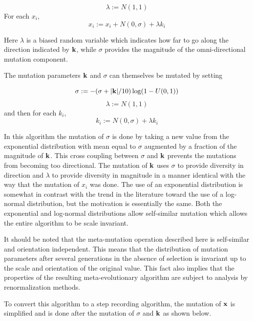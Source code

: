 \documentclass[12pt, titlepage]{article}
\begin{document}
\begin{displaymath}
\lambda := N(1,1)
\end{displaymath}
For each $x_i$,
\begin{displaymath}
x_i := x_i + N(0, \sigma) + \lambda k_i 
\end{displaymath}

Here $\lambda$ is a biased random variable which indicates how far to
go along the direction indicated by $\bf k$, while $\sigma$ provides
the magnitude of the omni-directional mutation component.

The mutation parameters $\bf k$ and $\sigma$ can themselves be mutated
by setting

\begin{displaymath}
\sigma := - (\sigma + |{\bf k}|/10) \log (1-U(0,1))
\end{displaymath}
\begin{displaymath}
\lambda := N(1,1)
\end{displaymath}
and then for each $k_i$,
\begin{displaymath}
k_i := N(0, \sigma) + \lambda k_i 
\end{displaymath}

In this algorithm the mutation of $\sigma$ is done by taking a new
value from the exponential distribution with mean equal to $\sigma$
augmented by a fraction of the magnitude of $\bf k$.  This cross
coupling between $\sigma$ and $\bf k$ prevents the mutations from
becoming too directional.  The mutation of $\bf k$ uses $\sigma$ to
provide diversity in direction and $\lambda$ to provide diversity in
magnitude in a manner identical with the way that the mutation of
$x_i$ was done.  The use of an exponential distribution is somewhat in
contrast with the trend in the literature toward the use of a
log-normal distribution, but the motivation is essentially the same.
Both the exponential and log-normal distributions allow self-similar
mutation which allows the entire algorithm to be scale invariant.

It should be noted that the meta-mutation operation described here is
self-similar and orientation independent.  This means that the
distribution of mutation parameters after several generations in the
absence of selection is invariant up to the scale and orientation of
the original value.  This fact also implies that the properties of the
resulting meta-evolutionary algorithm are subject to analysis by
renormalization methods.

To convert this algorithm to a step recording algorithm, the mutation
of $\bf x$ is simplified and is done after the mutation of $\sigma$
and $\bf k$ as shown below.
\end{document}
